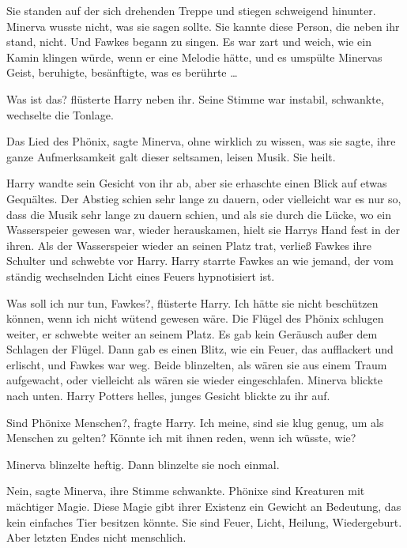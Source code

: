 Sie standen auf der sich drehenden Treppe und stiegen schweigend hinunter.
Minerva wusste nicht, was sie sagen sollte. Sie kannte diese Person, die neben
ihr stand, nicht. Und Fawkes begann zu singen. Es war zart und weich, wie ein
Kamin klingen würde, wenn er eine Melodie hätte, und es umspülte Minervas Geist,
beruhigte, besänftigte, was es berührte …

\glqq{}Was ist das?\grqq{} flüsterte Harry neben ihr. Seine Stimme war instabil,
schwankte, wechselte die Tonlage.

\glqq{}Das Lied des Phönix\grqq{}, sagte Minerva, ohne wirklich zu wissen, was
sie sagte, ihre ganze Aufmerksamkeit galt dieser seltsamen, leisen Musik. \glqq{}
Sie heilt.\grqq{}

Harry wandte sein Gesicht von ihr ab, aber sie erhaschte einen Blick auf etwas
Gequältes. Der Abstieg schien sehr lange zu dauern, oder vielleicht war es nur
so, dass die Musik sehr lange zu dauern schien, und als sie durch die Lücke, wo
ein Wasserspeier gewesen war, wieder herauskamen, hielt sie Harrys Hand fest in
der ihren. Als der Wasserspeier wieder an seinen Platz trat, verließ Fawkes ihre
Schulter und schwebte vor Harry. Harry starrte Fawkes an wie jemand, der vom
ständig wechselnden Licht eines Feuers hypnotisiert ist.

\glqq{}Was soll ich nur tun, Fawkes?\grqq{}, flüsterte Harry. \glqq{}Ich hätte sie
nicht beschützen können, wenn ich nicht wütend gewesen wäre.\grqq{} Die Flügel
des Phönix schlugen weiter, er schwebte weiter an seinem Platz. Es gab kein
Geräusch außer dem Schlagen der Flügel. Dann gab es einen Blitz, wie ein Feuer,
das aufflackert und erlischt, und Fawkes war weg. Beide blinzelten, als wären
sie aus einem Traum aufgewacht, oder vielleicht als wären sie wieder
eingeschlafen. Minerva blickte nach unten. Harry Potters helles, junges Gesicht
blickte zu ihr auf.

\glqq{}Sind Phönixe Menschen?\grqq{}, fragte Harry. \glqq{}Ich meine, sind sie
klug genug, um als Menschen zu gelten? Könnte ich mit ihnen reden, wenn ich
wüsste, wie?\grqq{}

Minerva blinzelte heftig. Dann blinzelte sie noch einmal.

\glqq{}Nein\grqq{}, sagte Minerva, ihre Stimme schwankte. \glqq{}Phönixe sind
Kreaturen mit mächtiger Magie. Diese Magie gibt ihrer Existenz ein Gewicht an
Bedeutung, das kein einfaches Tier besitzen könnte. Sie sind Feuer, Licht,
Heilung, Wiedergeburt. Aber letzten Endes nicht menschlich.\grqq{}

